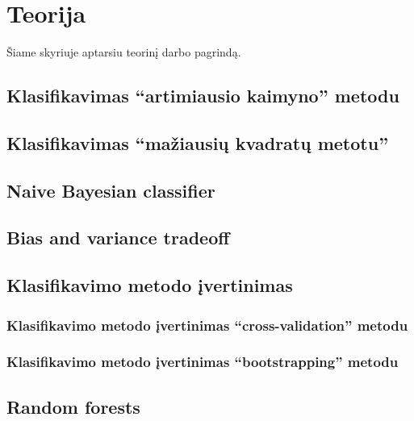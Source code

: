\documentclass{article}
\begin{document}
\let \savenumberline \numberline
\def \numberline#1{\savenumberline{#1.}}

%


\section{Teorija}
Šiame skyriuje aptarsiu teorinį darbo pagrindą.
\subsection{Klasifikavimas ``artimiausio kaimyno'' metodu}
\subsection{Klasifikavimas ``mažiausių kvadratų metotu''}
\subsection{Naive Bayesian classifier}
\subsection{Bias and variance tradeoff}
\subsection{Klasifikavimo metodo įvertinimas}
\subsubsection{Klasifikavimo metodo įvertinimas ``cross-validation'' metodu}
\subsubsection{Klasifikavimo metodo įvertinimas ``bootstrapping'' metodu}

\subsection{Random forests}
\end{document}
